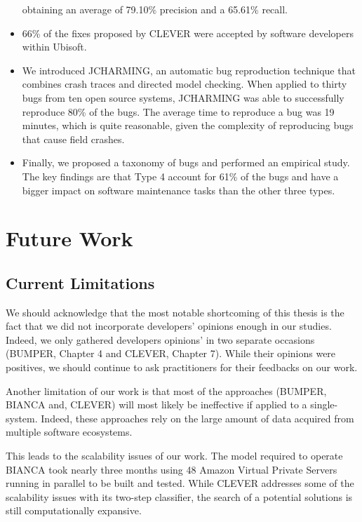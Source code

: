 \documentclass[12pt]{report}
\begin{document}
\begin{itemize}
  obtaining an average of 79.10\% precision and a 65.61\% recall.
\item
  66\% of the fixes proposed by CLEVER were accepted by software
  developers within Ubisoft.
\item
  We introduced JCHARMING, an automatic bug reproduction technique that
  combines crash traces and directed model checking. When applied to
  thirty bugs from ten open source systems, JCHARMING was able to
  successfully reproduce 80\% of the bugs. The average time to reproduce
  a bug was 19 minutes, which is quite reasonable, given the complexity
  of reproducing bugs that cause field crashes.
\item
  Finally, we proposed a taxonomy of bugs and performed an empirical
  study. The key findings are that Type 4 account for 61\% of the bugs
  and have a bigger impact on software maintenance tasks than the other
  three types.
\end{itemize}

\section{Future Work}\label{future-work}

\subsection{Current Limitations}\label{current-limitations}

We should acknowledge that the most notable shortcoming of this thesis
is the fact that we did not incorporate developers' opinions enough in
our studies. Indeed, we only gathered developers opinions' in two
separate occasions (BUMPER, Chapter 4 and CLEVER, Chapter 7). While
their opinions were positives, we should continue to ask practitioners
for their feedbacks on our work.

Another limitation of our work is that most of the approaches (BUMPER,
BIANCA and, CLEVER) will most likely be ineffective if applied to a
single-system. Indeed, these approaches rely on the large amount of data
acquired from multiple software ecosystems.

This leads to the scalability issues of our work. The model required to
operate BIANCA took nearly three months using 48 Amazon Virtual Private
Servers running in parallel to be built and tested. While CLEVER
addresses some of the scalability issues with its two-step classifier,
the search of a potential solutions is still computationally expansive.
\end{document}
